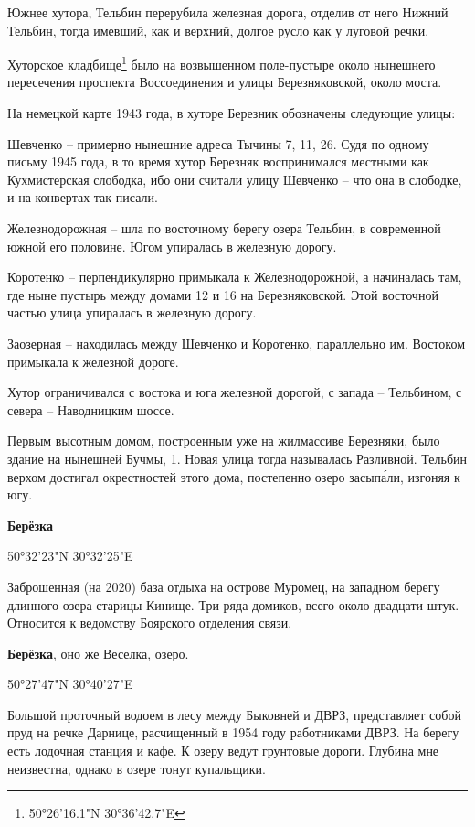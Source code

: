 Южнее хутора, Тельбин перерубила железная дорога, отделив от него Нижний Тельбин, тогда имевший, как и верхний, долгое русло как у луговой речки.

Хуторское кладбище\footnote{50°26'16.1"N 30°36'42.7"E} было на возвышенном поле-пустыре около нынешнего пересечения проспекта Воссоединения и улицы Березняковской, около моста.

На немецкой карте 1943 года, в хуторе Березник обозначены следующие улицы: 

Шевченко – примерно нынешние адреса Тычины 7, 11, 26. Судя по одному письму 1945 года, в то время хутор Березняк воспринимался местными как Кухмистерская слободка, ибо они считали улицу Шевченко – что она в слободке, и на конвертах так писали.

Железнодорожная – шла по восточному берегу озера Тельбин, в современной южной его половине. Югом упиралась в железную дорогу.

Коротенко – перпендикулярно примыкала к Железнодорожной, а начиналась там, где ныне пустырь между домами 12 и 16 на Березняковской. Этой восточной частью улица упиралась в железную дорогу.

Заозерная – находилась между Шевченко и Коротенко, параллельно им. Востоком примыкала к железной дороге.

Хутор ограничивался с востока и юга железной дорогой, с запада – Тельбином, с севера – Наводницким шоссе.

Первым высотным домом, построенным уже на жилмассиве Березняки, было здание на нынешней Бучмы, 1. Новая улица тогда называлась Разливной. Тельбин верхом достигал окрестностей этого дома, постепенно озеро засып\'али, изгоняя к югу.\\

\medskip

\textbf{Берёзка} 

50°32'23"N 30°32'25"E

Заброшенная (на 2020) база отдыха на острове Муромец, на западном берегу длинного озера-старицы Кинище. Три ряда домиков, всего около двадцати штук. Относится к ведомству Боярского отделения связи.\\

\medskip

\textbf{Берёзка}, оно же Веселка, озеро.

50°27'47"N 30°40'27"E

Большой проточный водоем в лесу между Быковней и ДВРЗ, представляет собой пруд на речке Дарнице, расчищенный в 1954 году работниками ДВРЗ. На берегу есть лодочная станция и кафе. К озеру ведут грунтовые дороги. Глубина мне неизвестна, однако в озере тонут купальщики.

